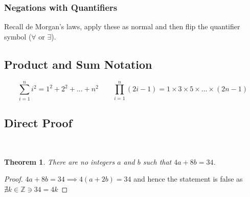 \documentclass[a4paper,twoside,10pt]{article}
\newenvironment{examquestion}[1]{%
	\mbox{}\\\tcolorbox[beamer,breakable,%
	title=Exam-style Question: #1,standard jigsaw,opacityback=0, colframe=red!75!black, boxrule=2pt]}{\endtcolorbox\mbox{}\\}
\newtheorem*{theorem*}{Theorem}
\begin{document}
			\subsubsection{Negations with Quantifiers}
				Recall de Morgan's laws, apply these as normal and then flip the quantifier symbol ($\forall$ or $\exists$).
		\subsection{Product and Sum Notation}
			\[
				\sum_{i=1}^ni^2=1^2+2^2+...+n^2 \qquad \prod_{i=1}^n(2i-1)=1\times3\times5\times...\times(2n-1)
			\]
		\subsection{Direct Proof}
			\begin{examquestion}{1000 Spesh Questions Doc Proof 3}
				\begin{theorem*}
					There are no integers $a$ and $b$ such that $4a+8b=34$.
				\end{theorem*}
				\begin{proof}
					$4a+8b=34\implies 4(a+2b)=34$ and hence the statement is false as $\nexists k\in\mathbb{Z}\ni 34=4k$
				\end{proof}
			\end{examquestion}
\end{document}
